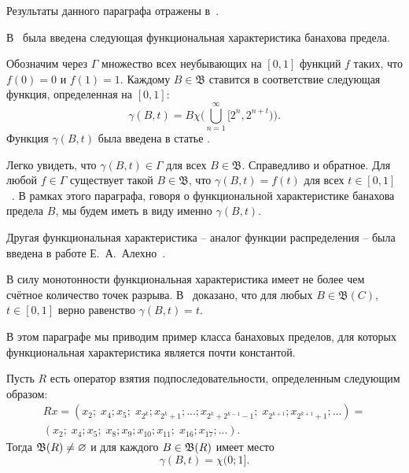 Результаты данного параграфа отражены в~\cite{avdeev2024set_DAN_rus}.


В~\cite{semenov2019mainclasses_rus} была введена следующая функциональная характеристика банахова предела.

Обозначим через $\Gamma$ множество всех неубывающих на $[0, 1]$ функций $f$ таких,
что $f(0) = 0$ и $f(1) = 1$. Каждому $B \in \mathfrak B$
ставится в соответствие следующая функция, определенная на $[0, 1]$:
$$
        \gamma(B, t) = B \chi\Bigg(\bigcup^\infty_{n = 1} [2^n, 2^{n + t})\Bigg)
        .
$$
Функция $\gamma(B,t)$ была введена в статье \cite{semenov2019mainclasses_rus}.

Легко увидеть, что $\gamma (B, t) \in \Gamma$ для всех $B \in \mathfrak B$.
Справедливо и обратное. Для любой $f \in \Gamma$ существует такой
$B \in \mathfrak B$, что $\gamma(B, t) = f(t)$ для всех
$t \in [0, 1]$~\cite[Предложение 2]{semenov2019mainclasses_rus}.
В рамках этого параграфа, говоря о функциональной характеристике банахова предела $B$,
мы будем иметь в виду именно $\gamma(B,t)$.

Другая функциональная характеристика -- аналог функции распределения -- была введена в работе Е.~А.~Алехно~\cite{alekhno2015banach}.

В силу монотонности функциональная характеристика имеет не более чем счётное количество точек разрыва.
В~\cite[Теорема 23]{semenov2019mainclasses_rus} доказано, что
для любых $B \in \mathfrak B(C)$, $t \in [0, 1]$ верно равенство $\gamma (B, t) = t$.

В этом параграфе мы приводим пример класса банаховых пределов,
для которых функциональная характеристика является почти константой.

\begin{lemma}
    Пусть $R$ есть оператор взятия подпоследовательности, определенным следующим образом:
	\begin{multline}
		\label{eq:sprawling_R}
		Rx = (x_2; \; x_4; x_5; \; x_{2^k}; x_{2^k + 1}; ... ; x_{2^k + 2^{k-1} - 1}; \; x_{2^{k+1}}; x_{2^{k+1} + 1};...)
		=\\
		(x_2; \; x_4; x_5; \; x_8; x_9; x_{10}; x_{11}; \; x_{16}; x_{17}; ...)
		.
	\end{multline}
    Тогда $\mathfrak{B}(R) \ne\varnothing$ и для каждого $B\in \mathfrak{B}(R)$ имеет место
    \begin{equation}
        \gamma(B, t) = \chi(0;1]
        .
    \end{equation}
\end{lemma}


